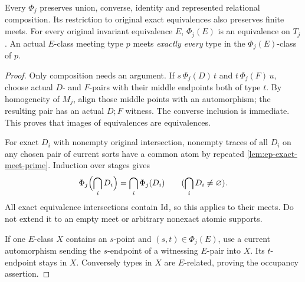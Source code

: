 \begin{lemma}
\label{lem:ep-phi-support}
Every \(\Phi_j\) preserves union, converse, identity
and represented relational composition. Its restriction to
original exact equivalences also preserves finite meets.
For every original invariant equivalence \(E\),
\(\Phi_j(E)\) is an equivalence on \(T_j\).
An actual \(E\)-class meeting type \(p\) meets
\emph{exactly every} type in the \(\Phi_j(E)\)-class of \(p\).
\end{lemma}
\begin{proof}
Only composition needs an argument. If
\(s\,\Phi_j(D)\,t\) and
\(t\,\Phi_j(F)\,u\), choose actual \(D\)- and
\(F\)-pairs with their middle endpoints both of type \(t\).
By homogeneity of \(M_j\), align those middle points with
an automorphism; the resulting pair has an actual
\(D;F\) witness. The converse inclusion is immediate.
This proves that images of equivalences are equivalences.

For exact \(D_i\) with nonempty original intersection,
nonempty traces of all \(D_i\) on any chosen pair of
current sorts have a common atom by repeated
\cref{lem:ep-exact-meet-prime}. Induction over stages
gives
\[
   \Phi_j\Bigl(\bigcap_iD_i\Bigr)
       =\bigcap_i\Phi_j(D_i)
       \qquad(\bigcap_iD_i\ne\varnothing).
\]
All exact equivalence intersections contain \(\mathrm{Id}\),
so this applies to their meets. Do not extend it to an
empty meet or arbitrary nonexact atomic supports.

If one \(E\)-class \(X\) contains an \(s\)-point and
\((s,t)\in\Phi_j(E)\), use a current automorphism sending
the \(s\)-endpoint of a witnessing \(E\)-pair into \(X\).
Its \(t\)-endpoint stays in \(X\). Conversely types
in \(X\) are \(E\)-related, proving the occupancy assertion.
\end{proof}

